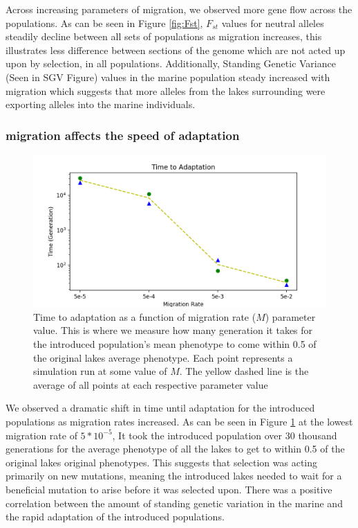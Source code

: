 \documentclass{article}
\begin{document}
Across increasing parameters of migration, we observed more gene flow across the populations. 
As can be seen in Figure \ref{fig:Fst},
$F_{st}$ values for neutral alleles steadily decline between all sets of populations as 
migration increases, this illustrates less difference between sections of the genome which are not acted up 
upon by selection, in all populations.
Additionally, Standing Genetic Variance 
(Seen in SGV Figure)
values in the marine population steady increased with migration which suggests that more alleles from the 
lakes surrounding were exporting alleles into the marine individuals.


\subsubsection*{migration affects the speed of adaptation}

\begin{figure}[h!tb]
	\begin{center}
  		\includegraphics[width=01.0\linewidth]{matplotlib/TimeToAdaptation.png}
  		\caption{Time to adaptation as a function of migration rate ($M$) parameter value. This is where we measure how many generation
		it takes for the introduced population's mean phenotype to come within 0.5 of the original lakes average phenotype. 
		Each point represents a simulation run at some value of $M$. 
		The yellow dashed line is the average of all points at each respective parameter value}
  		\label{fig:TimeToAdaptation}
	\end{center}
\end{figure}

We observed a dramatic shift in time until adaptation for the introduced populations
as migration rates increased. 
As can be seen in Figure \ref{fig:TimeToAdaptation} at the lowest migration rate of $5 * 10^{-5}$,
It took the introduced population over 30 thousand generations for the average phenotype of all the lakes to 
get to within 0.5 of the original lakes original phenotypes. 
This suggests that selection was acting primarily on new mutations, meaning the 
introduced lakes needed to wait for a beneficial mutation to arise before 
it was selected upon. 
There was a positive correlation between the amount of standing genetic variation in the 
marine and the rapid adaptation of the introduced populations.
\end{document}
